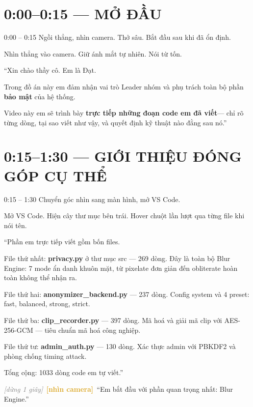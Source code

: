 \documentclass[12pt, a4paper]{article}
\newcommand{\pause}{\textcolor{gray}{\textit{[dừng 1 giây]}}}
\newcommand{\camlook}{\textcolor{Goldenrod}{\textbf{[nhìn camera]}}}
\begin{document}
\newpage
\section{0:00--0:15 --- MỞ ĐẦU}

\begin{timing}{0:00 -- 0:15}
Ngồi thẳng, nhìn camera. Thở sâu. Bắt đầu sau khi đã ổn định.
\end{timing}

\begin{cam}
Nhìn thẳng vào camera. Giữ ánh mắt tự nhiên. Nói từ tốn.
\end{cam}

\begin{say}
``Xin chào thầy cô. Em là Đạt.

Trong đồ án này em đảm nhận vai trò Leader nhóm
và phụ trách toàn bộ phần \textbf{bảo mật} của hệ thống.

Video này em sẽ trình bày \textbf{trực tiếp những đoạn code em đã viết}---
chỉ rõ từng dòng, tại sao viết như vậy, và quyết định kỹ thuật nào đằng sau nó.''
\end{say}

\section{0:15--1:30 --- GIỚI THIỆU ĐÓNG GÓP CỤ THỂ}

\begin{timing}{0:15 -- 1:30}
Chuyển góc nhìn sang màn hình, mở VS Code.
\end{timing}

\begin{doact}
Mở VS Code. Hiện cây thư mục bên trái. Hover chuột lần lượt qua từng file khi nói tên.
\end{doact}

\begin{say}
``Phần em trực tiếp viết gồm bốn files.

File thứ nhất: \textbf{privacy.py} ở thư mục src --- 269 dòng.
Đây là toàn bộ Blur Engine: 7 mode ẩn danh khuôn mặt, từ pixelate đơn giản đến obliterate hoàn toàn không thể nhận ra.

File thứ hai: \textbf{anonymizer\_backend.py} --- 237 dòng.
Config system và 4 preset: fast, balanced, strong, strict.

File thứ ba: \textbf{clip\_recorder.py} --- 397 dòng.
Mã hoá và giải mã clip với AES-256-GCM --- tiêu chuẩn mã hoá công nghiệp.

File thứ tư: \textbf{admin\_auth.py} --- 130 dòng.
Xác thực admin với PBKDF2 và phòng chống timing attack.

Tổng cộng: 1033 dòng code em tự viết.''

\pause\ \camlook\ ``Em bắt đầu với phần quan trọng nhất: Blur Engine.''
\end{say}
\end{document}
